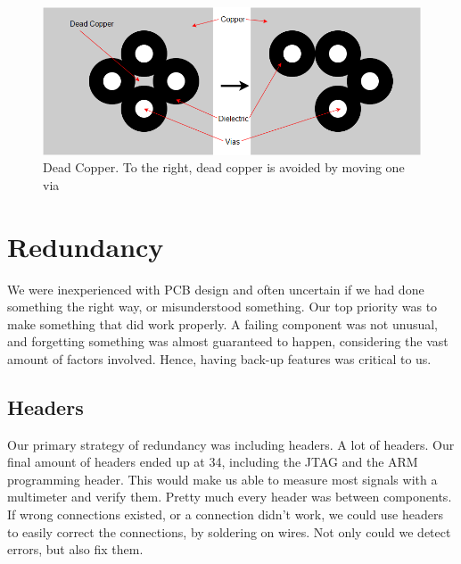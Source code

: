 \begin{itemize}
\begin{figure}[h!]
\centering
\includegraphics[scale = 0.4]{images/Dead_Copper.png}
\caption{Dead Copper. To the right, dead copper is avoided by moving one via}
\label{fig:Dead copper}
\end{figure}

\section{Redundancy}
We were inexperienced with PCB design and often uncertain if we had done something the right way, or misunderstood something. Our top priority was to make something that did work properly. A failing component was not unusual, and forgetting something was almost guaranteed to happen, considering the vast amount of factors involved. Hence, having back-up features was critical to us.
\subsection{Headers}
Our primary strategy of redundancy was including headers. A lot of headers. Our final amount of headers ended up at 34, including the JTAG and the ARM programming header. This would make us able to measure most signals with a multimeter and verify them. 
\newline
Pretty much every header was between components. If wrong connections existed, or a connection didn't work, we could use headers to easily correct the connections, by soldering on wires. Not only could we detect errors, but also fix them.


\end{itemize}
